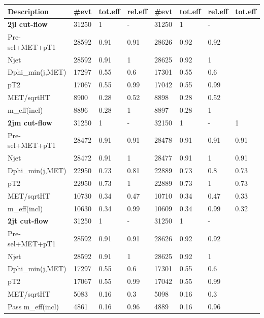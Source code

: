 \documentclass[11pt]{cernrep}
\begin{document}
\begin{table}[htbp]
\begin{tabular}{ | l || l | l | l || l | l | l || l | }
Description       & \#evt & tot.eff & rel.eff & \#evt & tot.eff & rel.eff &   tot.eff   \\ \hline \hline
{\bf 2jl cut-flow}                  & 31250 & 1 & - & 31250 & 1 & - & \   \\ \hline
Pre-sel+MET+pT1   & 28592 & 0.91 & 0.91 & 28626 & 0.92 & 0.92 & \   \\ \hline
Njet              & 28592 & 0.91 & 1 & 28625 & 0.92 & 1 & \   \\ \hline
Dphi\_min(j,MET)   & 17297 & 0.55 & 0.6 & 17301 & 0.55 & 0.6 & \   \\ \hline
pT2               & 17067 & 0.55 & 0.99 & 17042 & 0.55 & 0.99 & \   \\ \hline
MET/sqrtHT        & 8900 & 0.28 & 0.52 & 8898 & 0.28 & 0.52 & \   \\ \hline
m\_eff(incl)       & 8896 & 0.28 & 1 & 8897 & 0.28 & 1 & \   \\ \hline
\hline
{\bf 2jm cut-flow} & 31250 & 1 & - & 32150 & 1 & - & 1  \\ \hline
Pre-sel+MET+pT1   & 28472 & 0.91 & 0.91 & 28478 & 0.91 & 0.91 & 0.91  \\ \hline
Njet              & 28472 & 0.91 & 1 & 28477 & 0.91 & 1 & 0.91  \\ \hline
Dphi\_min(j,MET)   & 22950 & 0.73 & 0.81 & 22889 & 0.73 & 0.8 & 0.73  \\ \hline
pT2               & 22950 & 0.73 & 1 & 22889 & 0.73 & 1 & 0.73  \\ \hline
MET/sqrtHT        & 10730 & 0.34 & 0.47 & 10710 & 0.34 & 0.47 & 0.33  \\ \hline
m\_eff(incl)       & 10630 & 0.34 & 0.99 & 10609 & 0.34 & 0.99 & 0.32  \\ \hline
\hline
{\bf 2jt cut-flow} & 31250 & 1 & - & 31250 & 1 & - & \   \\ \hline
Pre-sel+MET+pT1   & 28592 & 0.91 & 0.91 & 28626 & 0.92 & 0.92 & \   \\ \hline
Njet              & 28592 & 0.91 & 1 & 28625 & 0.92 & 1 & \   \\ \hline
Dphi\_min(j,MET)   & 17297 & 0.55 & 0.6 & 17301 & 0.55 & 0.6 & \   \\ \hline
pT2               & 17067 & 0.55 & 0.99 & 17042 & 0.55 & 0.99 & \   \\ \hline
MET/sqrtHT        & 5083 & 0.16 & 0.3 & 5098 & 0.16 & 0.3 & \   \\ \hline
Pass m\_eff(incl)  & 4861 & 0.16 & 0.96 & 4889 & 0.16 & 0.96 & \   \\ \hline
\hline

\end{tabular}
\end{table}
\end{document}
